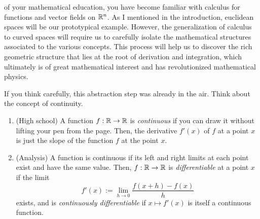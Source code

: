  of your mathematical education, you have become familiar with calculus for functions and vector fields on $\mathbb{R}^n$.
As I mentioned in the introduction, euclidean spaces will be our prototypical example.
However, the generalization of calculus to curved spaces will require us to carefully isolate the mathematical structures associated to the various concepts.
This process will help us to discover the rich geometric structure that lies at the root of derivation and integration, which ultimately is of great mathematical interest and has revolutionized mathematical physics.

If you think carefully, this abstraction step was already in the air. Think about the concept of continuity.

\begin{enumerate}
  \item (High school) A function $f:\mathbb{R}\to\mathbb{R}$ is \emph{continuous} if you can draw it without lifting your pen from the page.
  Then, the derivative $f'(x)$ of $f$ at a point $x$ is just the slope of the function $f$ at the point $x$.
  
  \item (Analysis) A function is continuous if its left and right limits at each point exist and have the same value.
  Then, $f:\mathbb{R}\to\mathbb{R}$ is \emph{differentiable} at a point $x$ if the limit
  \begin{equation}
    f'(x) := \lim_{h\to0} \frac{f(x+h) - f(x)}{h} 
  \end{equation}
  exists, and is \emph{continuously differentiable} if $x\mapsto f'(x)$ is itself a continuous function.
  

\end{enumerate}
